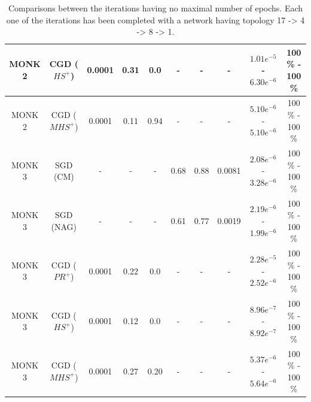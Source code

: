 \begin{table}[H]
\begin{subtable}{\textwidth}
{\begin{tabular}{| c | c | c | c | c | c | c | c | c | c |}
                            MONK 2 & CGD ($HS^{+}$) & 0.0001 & 0.31 & 0.0 & - & - & - &
                            $1.01e^{-5}$ - $6.30e^{-6}$ & 100 \% - 100 \% \\
                            \hline
                            \rowcolor[gray]{.9}
                            MONK 2 & CGD ($MHS^{+}$) & 0.0001 & 0.11 & 0.94 & - & - & - &
                            $5.10e^{-6}$ - $5.10e^{-6}$ & 100 \% - 100 \% \\
                            \hline
                            \hline
                            MONK 3 & SGD (CM) & - & - & - & 0.68 & 0.88 & 0.0081 &
                            $2.08e^{-6}$ - $3.28e^{-6}$
                            & 100 \% - 100 \% \\
                            \hline
                            MONK 3 & SGD (NAG) & - & - & - & 0.61 & 0.77 & 0.0019 &
                            $2.19e^{-6}$ - $1.99e^{-6}$ & 100 \% - 100 \% \\
                            \hline
                            MONK 3 & CGD ($PR^{+}$) & 0.0001 & 0.22 & 0.0 & - & - & - &
                            $2.28e^{-5}$ - $2.52e^{-6}$ & 100 \% - 100 \% \\
                            \hline
                            \rowcolor[gray]{.9}
                            MONK 3 & CGD ($HS^{+}$) & 0.0001 & 0.12 & 0.0 & - & - & - &
                            $8.96e^{-7}$ - $8.92e^{-7}$ & 100 \% - 100 \% \\
                            \hline
                            MONK 3 & CGD ($MHS^{+}$) & 0.0001 & 0.27 & 0.20 & - & - & - &
                            $5.37e^{-6}$ - $5.64e^{-6}$ & 100 \% - 100 \% \\
                            \hline
                        \end{tabular}
                    }
                \end{subtable}
                \caption{Comparisons between the iterations having no maximal number of epochs. Each one of the
                iterations has been completed with a network having topology 17 -> 4 -> 8 -> 1.}
                \label{tab:monks_no_max_epochs}
            \end{table}

